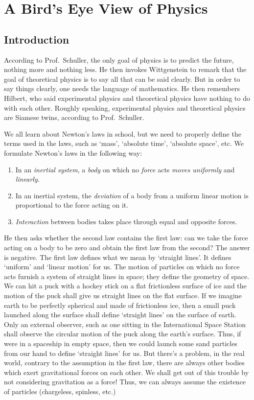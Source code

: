 \documentclass[a4paper, 11pt]{book}
\theoremstyle{definition}
\begin{document}
    \mainmatter

    \chapter{A Bird's Eye View of Physics}

    \section{Introduction}

    According to Prof.\ Schuller, the only goal of physics is to predict the future, nothing more and nothing less. He then invokes Wittgenstein to remark that the goal of theoretical physics is to say all that can be said clearly. But in order to say things clearly, one needs the language of mathematics. He then remembers Hilbert, who said experimental physics and theoretical physics have nothing to do with each other. Roughly speaking, experimental physics and theoretical physics are Siamese twins, according to Prof.\ Schuller.

    We all learn about Newton's laws in school, but we need to properly define the terms used in the laws, such as `mass', `absolute time', `absolute space', etc. We formulate Newton's laws in the following way:
    \begin{enumerate}
        \item In an \textit{inertial system}, a \textit{body} on which no \textit{force} acts \textit{moves uniformly} and \textit{linearly}.
        \item In an inertial system, the \textit{deviation} of a body from a uniform linear motion is proportional to the force acting on it.
        \item \textit{Interaction} between bodies takes place through equal and opposite forces.
    \end{enumerate}
    He then asks whether the second law contains the first law: can we take the force acting on a body to be zero and obtain the first law from the second? The answer is negative. The first law defines what we mean by `straight lines'. It defines `uniform' and `linear motion' for us. The motion of particles on which no force acts furnish a system of straight lines in space; they define the geometry of space. We  can hit a puck with a hockey stick on a flat frictionless surface of ice and the motion of the puck shall give us straight lines on the flat surface. If we imagine earth to be perfectly spherical and made of frictionless ice, then a small puck launched along the surface shall define `straight lines' on the surface of earth. Only an external observer, such as one sitting in the International Space Station shall observe the circular motion of the puck along the earth's surface. Thus, if were in a spaceship in empty space, then we could launch some sand particles from our hand to define `straight lines' for us. But there's a problem, in the real world, contrary to the assumption in the first law, there are always other bodies which exert gravitational forces on each other. We shall get out of this trouble by not considering gravitation as a force! Thus, we can always assume the existence of particles (chargeless, spinless, etc.)
\end{document}
